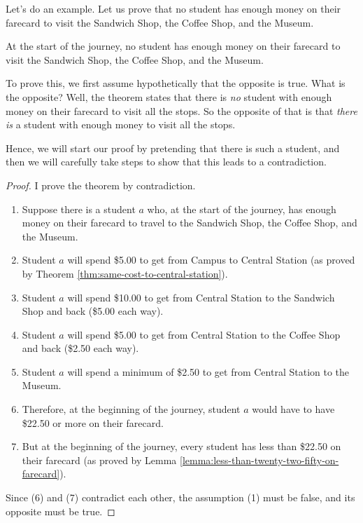 \documentclass[../../../main.tex]{subfiles}
\begin{document}
Let's do an example. Let us prove that no student has enough money on their farecard to visit the Sandwich Shop, the Coffee Shop, and the Museum.

\begin{framed}
  \begin{theorem}
    At the start of the journey, no student has enough money on their farecard to visit the Sandwich Shop, the Coffee Shop, and the Museum.
  \end{theorem}
\end{framed}

To prove this, we first assume hypothetically that the opposite is true. What is the opposite? Well, the theorem states that there is \emph{no} student with enough money on their farecard to visit all the stops. So the opposite of that is that \emph{there is} a student with enough money to visit all the stops.

Hence, we will start our proof by pretending that there is such a student, and then we will carefully take steps to show that this leads to a contradiction.

\begin{framed}
  \begin{proof}
    I prove the theorem by contradiction.
    
    \begin{enumerate}
    
      \item Suppose there is a student $a$ who, at the start of the journey, has enough money on their farecard to travel to the Sandwich Shop, the Coffee Shop, and the Museum.
      
      \item Student $a$ will spend \$5.00 to get from Campus to Central Station (as proved by Theorem \ref{thm:same-cost-to-central-station}).
      
      \item Student $a$ will spend \$10.00 to get from Central Station to the Sandwich Shop and back (\$5.00 each way).
      
      \item Student $a$ will spend \$5.00 to get from Central Station to the Coffee Shop and back (\$2.50 each way).
      
      \item Student $a$ will spend a minimum of \$2.50 to get from Central Station to the Museum.
      
      \item Therefore, at the beginning of the journey, student $a$ would have to have \$22.50 or more on their farecard.
      
      \item But at the beginning of the journey, every student has less than \$22.50 on their farecard (as proved by Lemma \ref{lemma:less-than-twenty-two-fifty-on-farecard}).
      
    \end{enumerate}
    
    \noindent
    Since (6) and (7) contradict each other, the assumption (1) must be false, and its opposite must be true.
  \end{proof}
\end{framed}
\end{document}
